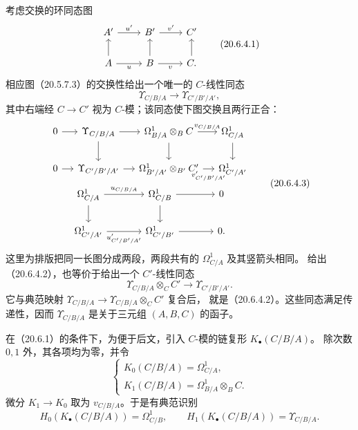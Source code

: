 考虑交换的环同态图
\begin{equation}
\begin{tikzcd}
 A'\arrow[r,"u'"]&B'\arrow[r,"v'"]&C'\\
 A\arrow[u]\arrow[r,"u"']&B\arrow[u]\arrow[r,"v"']&C.\arrow[u]
\end{tikzcd}
\tag{20.6.4.1}
\end{equation}
相应图（20.5.7.3）的交换性给出一个唯一的 $C$-线性同态
\begin{equation}
 \Upsilon_{C/B/A}\longrightarrow\Upsilon_{C'/B'/A'},
 \tag{20.6.4.2}
\end{equation}
其中右端经 $C\to C'$ 视为 $C$-模；该同态使下图交换且两行正合：
\begin{equation}
\begin{gathered}
\begin{tikzcd}[column sep=small]
0\arrow[r]&\Upsilon_{C/B/A}\arrow[r]\arrow[d]&
 \Omega^1_{B/A}\otimes_B C\arrow[r,"v_{C/B/A}"]\arrow[d]&
 \Omega^1_{C/A}\arrow[d]\\
0\arrow[r]&\Upsilon_{C'/B'/A'}\arrow[r]&
 \Omega^1_{B'/A'}\otimes_{B'} C'\arrow[r,"v'_{C'/B'/A'}"']&
 \Omega^1_{C'/A'}
\end{tikzcd}\\[-.2em]
\begin{tikzcd}[column sep=large]
\Omega^1_{C/A}\arrow[r,"u_{C/B/A}"]\arrow[d]&\Omega^1_{C/B}\arrow[r]\arrow[d]&0\\
\Omega^1_{C'/A'}\arrow[r,"u'_{C'/B'/A'}"']&\Omega^1_{C'/B'}\arrow[r]&0 .
\end{tikzcd}
\end{gathered}
\tag{20.6.4.3}
\end{equation}
这里为排版把同一长图分成两段，两段共有的 $\Omega^1_{C/A}$ 及其竖箭头相同。
给出（20.6.4.2），也等价于给出一个 $C'$-线性同态
\begin{equation}
 \Upsilon_{C/B/A}\otimes_C C'\longrightarrow\Upsilon_{C'/B'/A'}.
 \tag{20.6.4.4}
\end{equation}
它与典范映射 $\Upsilon_{C/B/A}\to\Upsilon_{C/B/A}\otimes_C C'$ 复合后，
就是（20.6.4.2）。这些同态满足传递性，因而
$\Upsilon_{C/B/A}$ 是关于三元组 $(A,B,C)$ 的函子。

在（20.6.1）的条件下，为便于后文，引入 $C$-模的链复形 $K_\bullet(C/B/A)$。
除次数 $0,1$ 外，其各项均为零，并令
\begin{equation}
 \begin{cases}
 K_0(C/B/A)=\Omega^1_{C/A},\\
 K_1(C/B/A)=\Omega^1_{B/A}\otimes_B C .
 \end{cases}
 \tag{20.6.5.1}
\end{equation}
微分 $K_1\to K_0$ 取为 $v_{C/B/A}$。于是有典范识别
\begin{equation}
 H_0(K_\bullet(C/B/A))=\Omega^1_{C/B},\qquad
 H_1(K_\bullet(C/B/A))=\Upsilon_{C/B/A}.
 \tag{20.6.5.2}
\end{equation}

